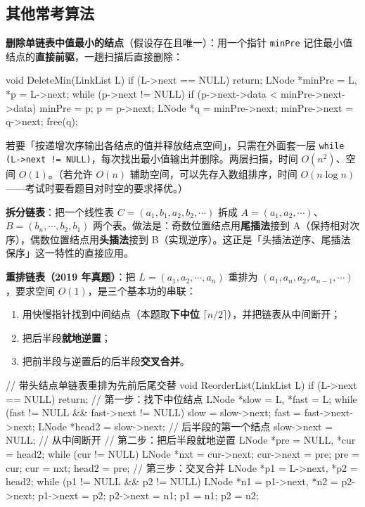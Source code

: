\documentclass[11pt,openany,UTF8]{ctexbook}
\begin{document}
\subsection{其他常考算法}

\textbf{删除单链表中值最小的结点}（假设存在且唯一）：用一个指针 \texttt{minPre} 记住最小值结点的\textbf{直接前驱}，一趟扫描后直接删除：

\begin{codebox}
void DeleteMin(LinkList L) {
    if (L->next == NULL) return;
    LNode *minPre = L, *p = L->next;
    while (p->next != NULL) {
        if (p->next->data < minPre->next->data) minPre = p;
        p = p->next;
    }
    LNode *q = minPre->next;
    minPre->next = q->next;
    free(q);
}
\end{codebox}

若要「按递增次序输出各结点的值并释放结点空间」，只需在外面套一层 \texttt{while (L->\allowbreak{}next !=\allowbreak{} NULL)\allowbreak{}}，每次找出最小值输出并删除。两层扫描，时间 $O(n^2)$、空间 $O(1)$。（若允许 $O(n)$ 辅助空间，可以先存入数组排序，时间 $O(n\log n)$——考试时要看题目对时空的要求择优。）

\textbf{拆分链表}：把一个线性表 $C = (a_1,b_1,a_2,b_2,\cdots)$ 拆成 $A = (a_1,a_2,\cdots)$、$B = (b_n,\cdots,b_2,b_1)$ 两个表。做法是：奇数位置结点用\textbf{尾插法}接到 A（保持相对次序），偶数位置结点用\textbf{头插法}接到 B（实现逆序）。这正是「头插法逆序、尾插法保序」这一特性的直接应用。

\textbf{重排链表（2019 年真题）}：把 $L = (a_1,a_2,\cdots,a_n)$ 重排为 $(a_1,a_n,a_2,a_{n-1},\cdots)$，要求空间 $O(1)$，是三个基本功的串联：

\begin{enumerate}
\item 用快慢指针找到中间结点（本题取\textbf{下中位} $\lceil n/2 \rceil$），并把链表从中间断开；
\item 把后半段\textbf{就地逆置}；
\item 把前半段与逆置后的后半段\textbf{交叉合并}。
\end{enumerate}
\begin{codebox}
// 带头结点单链表重排为先前后尾交替
void ReorderList(LinkList L) {
    if (L->next == NULL) return;
    // 第一步：找下中位结点
    LNode *slow = L, *fast = L;
    while (fast != NULL && fast->next != NULL) {
        slow = slow->next;
        fast = fast->next->next;
    }
    LNode *head2 = slow->next;   // 后半段的第一个结点
    slow->next = NULL;           // 从中间断开
    // 第二步：把后半段就地逆置
    LNode *pre = NULL, *cur = head2;
    while (cur != NULL) {
        LNode *nxt = cur->next;
        cur->next = pre;
        pre = cur;
        cur = nxt;
    }
    head2 = pre;
    // 第三步：交叉合并
    LNode *p1 = L->next, *p2 = head2;
    while (p1 != NULL && p2 != NULL) {
        LNode *n1 = p1->next, *n2 = p2->next;
        p1->next = p2;
        p2->next = n1;
        p1 = n1;
        p2 = n2;
    }
}
\end{codebox}
\end{document}
